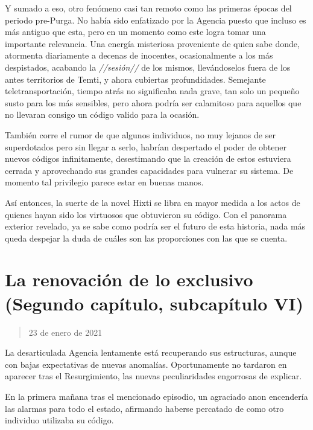 \documentclass[
  spanish,
]{book}
\begin{document}
Y sumado a eso, otro fenómeno casi tan remoto como las primeras épocas del periodo pre-Purga. No había sido enfatizado por la Agencia puesto que incluso es más antiguo que esta, pero en un momento como este logra tomar una importante relevancia. Una energía misteriosa proveniente de quien sabe donde, atormenta diariamente a decenas de inocentes, ocasionalmente a los más despistados, acabando la \emph{//sesión//} de los mismos, llevándoselos fuera de los antes territorios de Temti, y ahora cubiertas profundidades. Semejante teletransportación, tiempo atrás no significaba nada grave, tan solo un pequeño susto para los más sensibles, pero ahora podría ser calamitoso para aquellos que no llevaran consigo un código valido para la ocasión.

También corre el rumor de que algunos individuos, no muy lejanos de ser superdotados pero sin llegar a serlo, habrían despertado el poder de obtener nuevos códigos infinitamente, desestimando que la creación de estos estuviera cerrada y aprovechando sus grandes capacidades para vulnerar su sistema. De momento tal privilegio parece estar en buenas manos.

Así entonces, la suerte de la novel Hixti se libra en mayor medida a los actos de quienes hayan sido los virtuosos que obtuvieron su código. Con el panorama exterior revelado, ya se sabe como podría ser el futuro de esta historia, nada más queda despejar la duda de cuáles son las proporciones con las que se cuenta.

\hypertarget{la-renovaciuxf3n-de-lo-exclusivo-segundo-capuxedtulo-subcapuxedtulo-vi}{%
\section{La renovación de lo exclusivo (Segundo capítulo, subcapítulo VI)}\label{la-renovaciuxf3n-de-lo-exclusivo-segundo-capuxedtulo-subcapuxedtulo-vi}}

\begin{quote}
23 de enero de 2021
\end{quote}

La desarticulada Agencia lentamente está recuperando sus estructuras, aunque con bajas expectativas de nuevas anomalías. Oportunamente no tardaron en aparecer tras el Resurgimiento, las nuevas peculiaridades engorrosas de explicar.

En la primera mañana tras el mencionado episodio, un agraciado anon encendería las alarmas para todo el estado, afirmando haberse percatado de como otro individuo utilizaba su código.
\end{document}
